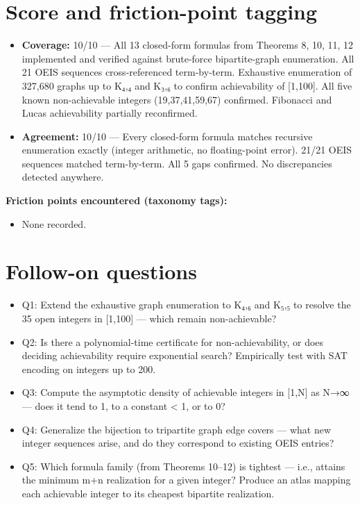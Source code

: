 \documentclass[11pt]{article}
\begin{document}
\section{Score and friction-point tagging}\label{sec:friction}
\begin{itemize}
\item \textbf{Coverage:} 10/10 --- All 13 closed-form formulas from Theorems 8, 10, 11, 12 implemented and verified against brute-force bipartite-graph enumeration. All 21 OEIS sequences cross-referenced term-by-term. Exhaustive enumeration of 327,680 graphs up to K₄,₄ and K₃,₆ to confirm achievability of [1,100]. All five known non-achievable integers (19,37,41,59,67) confirmed. Fibonacci and Lucas achievability partially reconfirmed.
\item \textbf{Agreement:} 10/10 --- Every closed-form formula matches recursive enumeration exactly (integer arithmetic, no floating-point error). 21/21 OEIS sequences matched term-by-term. All 5 gaps confirmed. No discrepancies detected anywhere.
\end{itemize}

\noindent\textbf{Friction points encountered (taxonomy tags):}
\begin{itemize}
\item None recorded.
\end{itemize}

\section{Follow-on questions}
\begin{itemize}
\item Q1: Extend the exhaustive graph enumeration to K₄,₆ and K₅,₅ to resolve the 35 open integers in [1,100] — which remain non-achievable?
\item Q2: Is there a polynomial-time certificate for non-achievability, or does deciding achievability require exponential search? Empirically test with SAT encoding on integers up to 200.
\item Q3: Compute the asymptotic density of achievable integers in [1,N] as N→∞ — does it tend to 1, to a constant \textless{} 1, or to 0?
\item Q4: Generalize the bijection to tripartite graph edge covers — what new integer sequences arise, and do they correspond to existing OEIS entries?
\item Q5: Which formula family (from Theorems 10–12) is tightest — i.e., attains the minimum m+n realization for a given integer? Produce an atlas mapping each achievable integer to its cheapest bipartite realization.
\end{itemize}
\end{document}

